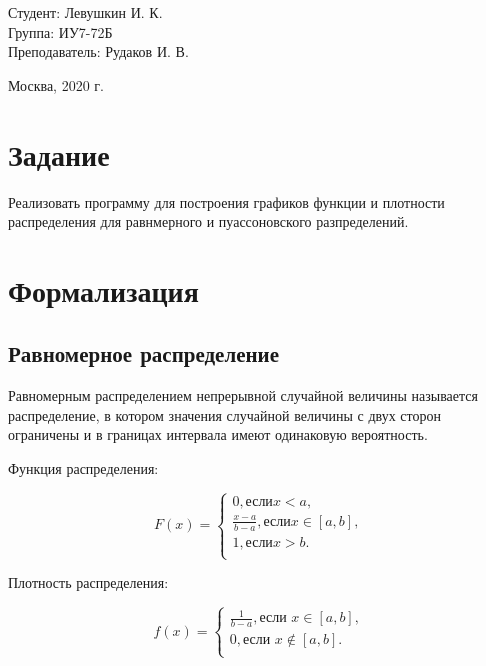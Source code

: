 \documentclass[a4paper,12pt]{article}
\begin{document}
	\large
	\begin{flushright}
		Студент: Левушкин И. К. \\
		Группа: ИУ7-72Б \\
		Преподаватель: Рудаков И. В. \\
	\end{flushright}
	
	\vspace*{25mm}
	\begin{center}
		Москва, 2020 г.  
	\end{center}
	\thispagestyle{empty}
	
	
	\newpage
	
	\section*{Задание}
	
	Реализовать программу для построения графиков функции и плотности распределения для равнмерного и пуассоновского разпределений.
	
	\section*{Формализация}
	
	\subsection*{Равномерное распределение}
	
	Равномерным распределением непрерывной случайной величины называется распределение, в котором значения случайной величины с двух сторон ограничены и в границах интервала имеют одинаковую вероятность.
	
	Функция распределения:
	
	\[
	F(x) = \begin{cases}
	0, \text{если} x < a,\\
	\frac{x-a}{b-a}, \text{если} x \in [a, b],\\
	1, \text{если} x > b.\\
	\end{cases}
	\]
	
	
	Плотность распределения:
	
	\[
	f(x) = \begin{cases}
	\frac{1}{b-a}, \text{если } x \in [a, b],\\
	0, \text{если } x \notin [a, b].\\
	\end{cases}
	\]
	
\end{document}
